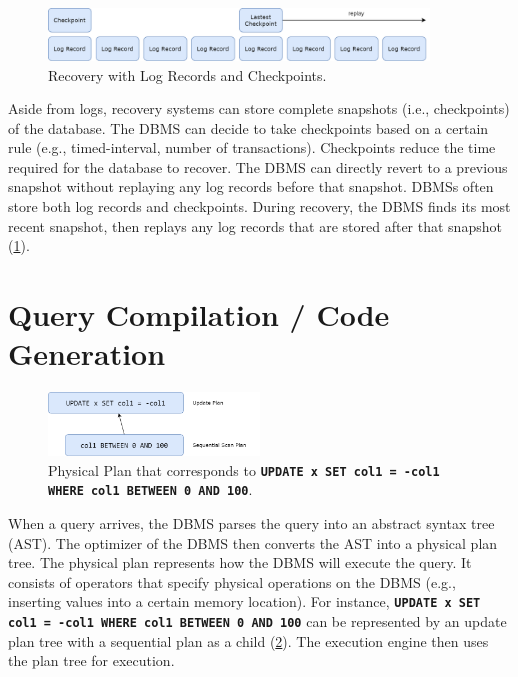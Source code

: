 \documentclass[12pt]{cmuthesis}
\newcommand{\dbSQL}[1]{\texttt{\textbf{#1}}\xspace}
\begin{document}
\begin{figure}[t!]
\centering
\includegraphics[width=0.9\textwidth]{images/RecoveryCheckpoint.png}
\caption{Recovery with Log Records and Checkpoints.}
\label{fig:recovery_checkpoint}
\end{figure}

Aside from logs, recovery systems can store complete snapshots (i.e., checkpoints) of the database. The DBMS can decide to take checkpoints based on a certain rule (e.g., timed-interval, number of transactions). Checkpoints reduce the time required for the database to recover. The DBMS can directly revert to a previous snapshot without replaying any log records before that snapshot. DBMSs often store both log records and checkpoints. During recovery, the DBMS finds its most recent snapshot, then replays any log records that are stored after that snapshot (\cref{fig:recovery_checkpoint}).

\section{Query Compilation / Code Generation}
\begin{figure}[t!]
\centering
\includegraphics[width=0.5\textwidth]{images/PhysicalPlanExample.png}
\caption{Physical Plan that corresponds to \dbSQL{UPDATE x SET col1 = -col1 WHERE col1 BETWEEN 0 AND 100}.}
\label{fig:physical_plan_example}
\end{figure}
When a query arrives, the DBMS parses the query into an abstract syntax tree (AST). The optimizer of the DBMS then converts the AST into a physical plan tree. The physical plan represents how the DBMS will execute the query. It consists of operators that specify physical operations on the DBMS (e.g., inserting values into a certain memory location). For instance, \dbSQL{UPDATE x SET col1 = -col1 WHERE col1 BETWEEN 0 AND 100} can be represented by an update plan tree with a sequential plan as a child (\cref{fig:physical_plan_example}). The execution engine then uses the plan tree for execution.
\end{document}
